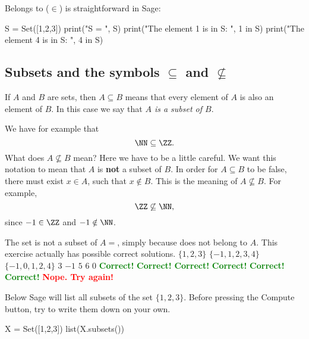 \documentclass{article}
\newcommand{\red}[1]{\textcolor{red}{\textbf{#1}}}
\newcommand{\green}[1]{\textcolor{green}{\textbf{#1}}}
\begin{document}
Belongs to ($\in$) is straightforward in Sage:

\begin{code}
S = Set([1,2,3])
print("S = ", S)
print("The element 1 is in S: ", 1 in S)
print("The element 4 is in S: ", 4 in S)
\end{code}



\subsection{Subsets and the symbols $\subseteq$ and $\not\subseteq$}

If $A$ and $B$ are sets, then $A\subseteq B$ means that
every element of $A$ is also an element of $B$. In this case we say
that \emph{$A$ is a subset of $B$}.

We have
for example that 
$$
\NN \subseteq \ZZ.
$$
What does $A\not\subseteq B$ mean? Here we have to be a little
careful. We want this notation to mean that $A$ is \textbf{not} a
subset of $B$. In order for $A\subseteq B$ to be
false, there must exist $x\in A$, such that $x\notin B$. This
is the meaning of $A\not\subseteq B$. For example, 
$$
\ZZ\not\subseteq \NN,
$$
since $-1\in \ZZ$ and $-1\notin \NN$.

\begin{quizexercise}[showhide]
\begin{paraquiz}
  \question
  The set \box is not a subset of $A=$\box, simply because \box does not belong to $A$.
  This exercise actually has \box possible correct solutions.
  \answer
  $\{1, 2, 3\}$
  \answer
  $\{-1, 1, 2, 3, 4\}$
  \answer
  $\{-1, 0, 1, 2, 4\}$
  \answer
  $3$
  \answer
  $-1$
  \answer
  $5$
  \answer
  $6$
  \answer
  $0$
  \green{Correct!}
  \green{Correct!}
  \green{Correct!}
  \green{Correct!}
  \green{Correct!}
  \green{Correct!}
  \red{Nope. Try again!}
\end{paraquiz}
\end{quizexercise}



Below Sage will list all subsets of the set $\{1, 2, 3\}$. Before pressing
the Compute button, try to write them down on your own.

\begin{sage}
X = Set([1,2,3])
list(X.subsets())
\end{sage}
\end{document}
